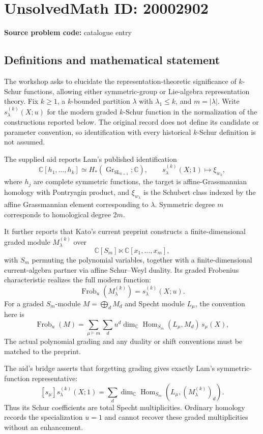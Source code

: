 \documentclass[11pt]{article}
\newcommand{\C}{\mathbb{C}}
\begin{document}
\section*{UnsolvedMath ID: 20002902}
\textbf{Source problem code:} catalogue entry
\subsection{Definitions and mathematical statement}
The workshop asks to elucidate the representation-theoretic significance of $k$-Schur functions, allowing either symmetric-group or Lie-algebra representation theory. Fix $k\geq1$, a $k$-bounded partition $\lambda$ with $\lambda_1\leq k$, and $m=|\lambda|$. Write $s_\lambda^{(k)}(X;u)$ for the modern graded $k$-Schur function in the normalization of the constructions reported below. The original record does not define its candidate or parameter convention, so identification with every historical $k$-Schur definition is not assumed.

The supplied aid reports Lam's published identification
\[
\C[h_1,\ldots,h_k]\simeq H_*(\operatorname{Gr}_{\operatorname{SL}_{k+1}};\C),\qquad
s_\lambda^{(k)}(X;1)\longmapsto\xi_{w_\lambda},
\]
where $h_j$ are complete symmetric functions, the target is affine-Grassmannian homology with Pontryagin product, and $\xi_{w_\lambda}$ is the Schubert class indexed by the affine Grassmannian element corresponding to $\lambda$. Symmetric degree $m$ corresponds to homological degree $2m$.

It further reports that Kato's current preprint constructs a finite-dimensional graded module $M_\lambda^{(k)}$ over
\[
\C[S_m]\ltimes\C[x_1,\ldots,x_m],
\]
with $S_m$ permuting the polynomial variables, together with a finite-dimensional current-algebra partner via affine Schur--Weyl duality. Its graded Frobenius characteristic realizes the full modern function:
\[
\operatorname{Frob}_u(M_\lambda^{(k)})=s_\lambda^{(k)}(X;u).
\]
For a graded $S_m$-module $M=\bigoplus_dM_d$ and Specht module $L_\mu$, the convention here is
\[
\operatorname{Frob}_u(M)=\sum_{\mu\vdash m}\sum_d
u^d\dim_\C\operatorname{Hom}_{S_m}(L_\mu,M_d)\,s_\mu(X),
\]
The actual polynomial grading and any duality or shift conventions must be matched to the preprint.

The aid's bridge asserts that forgetting grading gives exactly Lam's symmetric-function representative:
\[
[s_\mu]s_\lambda^{(k)}(X;1)
=\sum_d\dim_\C\operatorname{Hom}_{S_m}(L_\mu,(M_\lambda^{(k)})_d).
\]
Thus its Schur coefficients are total Specht multiplicities. Ordinary homology records the specialization $u=1$ and cannot recover these graded multiplicities without an enhancement.
\end{document}
